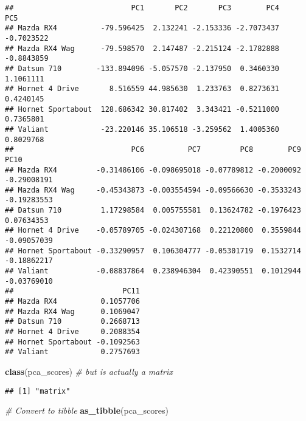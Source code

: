 \documentclass[
]{book}
\newenvironment{Shaded}{}{}
\newcommand{\CommentTok}[1]{\textcolor[rgb]{0.38,0.63,0.69}{\textit{#1}}}
\newcommand{\KeywordTok}[1]{\textcolor[rgb]{0.00,0.44,0.13}{\textbf{#1}}}
\newcommand{\NormalTok}[1]{#1}
\newcommand{\OperatorTok}[1]{\textcolor[rgb]{0.40,0.40,0.40}{#1}}
\newcommand{\StringTok}[1]{\textcolor[rgb]{0.25,0.44,0.63}{#1}}
\begin{document}
\begin{Shaded}
\end{Shaded}

\begin{verbatim}
##                           PC1       PC2       PC3        PC4        PC5
## Mazda RX4          -79.596425  2.132241 -2.153336 -2.7073437 -0.7023522
## Mazda RX4 Wag      -79.598570  2.147487 -2.215124 -2.1782888 -0.8843859
## Datsun 710        -133.894096 -5.057570 -2.137950  0.3460330  1.1061111
## Hornet 4 Drive       8.516559 44.985630  1.233763  0.8273631  0.4240145
## Hornet Sportabout  128.686342 30.817402  3.343421 -0.5211000  0.7365801
## Valiant            -23.220146 35.106518 -3.259562  1.4005360  0.8029768
##                           PC6          PC7         PC8        PC9        PC10
## Mazda RX4         -0.31486106 -0.098695018 -0.07789812 -0.2000092 -0.29008191
## Mazda RX4 Wag     -0.45343873 -0.003554594 -0.09566630 -0.3533243 -0.19283553
## Datsun 710         1.17298584  0.005755581  0.13624782 -0.1976423  0.07634353
## Hornet 4 Drive    -0.05789705 -0.024307168  0.22120800  0.3559844 -0.09057039
## Hornet Sportabout -0.33290957  0.106304777 -0.05301719  0.1532714 -0.18862217
## Valiant           -0.08837864  0.238946304  0.42390551  0.1012944 -0.03769010
##                         PC11
## Mazda RX4          0.1057706
## Mazda RX4 Wag      0.1069047
## Datsun 710         0.2668713
## Hornet 4 Drive     0.2088354
## Hornet Sportabout -0.1092563
## Valiant            0.2757693
\end{verbatim}

\begin{Shaded}
\begin{Highlighting}[]
\KeywordTok{class}\NormalTok{(pca_scores) }\CommentTok{# but is actually a matrix}
\end{Highlighting}
\end{Shaded}

\begin{verbatim}
## [1] "matrix"
\end{verbatim}

\begin{Shaded}
\begin{Highlighting}[]
\CommentTok{# Convert to tibble}
\KeywordTok{as_tibble}\NormalTok{(pca_scores)}
\end{Highlighting}
\end{Shaded}
\end{document}
